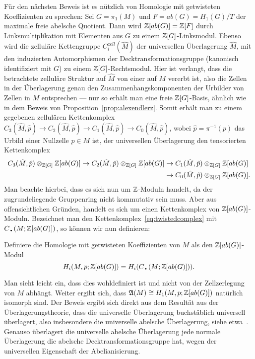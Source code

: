 	Für den nächsten Beweis ist es nützlich von Homologie mit getwisteten Koeffizienten zu sprechen: Sei $G=\pi_1(M)$ und $F=ab(G)=H_1(G)/T$ der maximale freie abelsche Quotient. Dann wird $\mathbb{Z}[ab(G)]=\mathbb{Z}[F]$ durch Linksmultiplikation mit Elementen aus $G$ zu einem $\mathbb{Z}[G]$-Linksmodul. Ebenso wird die zelluläre Kettengruppe $C^{zell}_i(\hat M)$ der universellen Überlagerung $\hat M$, mit den induzierten Automorphismen der Decktransformationsgruppe (kanonisch identifiziert mit $G$) zu einem $\mathbb{Z}[G]$-Rechtsmodul. Hier ist verlangt, dass die betrachtete zelluläre Struktur auf $\hat M$ von einer auf $M$ vererbt ist, also die Zellen in der Überlagerung genau den Zusammenhangskomponenten der Urbilder von Zellen in $M$ entsprechen --- nur so erhält man eine freie $\mathbb{Z}[G]$-Basis, ähnlich wie in dem Beweis von Proposition~\ref{prop:alexendlerz}. Somit erhält man zu einem gegebenen zellulären Kettenkomplex $C_3(\hat M,\hat p) \to C_2(\hat M,\hat p) \to C_1(\hat M,\hat p) \to C_0(\hat M,\hat p)$, wobei $\hat p = \pi^{-1}(p)$ das Urbild einer Nullzelle $p\in M$ ist, der universellen Überlagerung den tensorierten Kettenkomplex 
\begin{align}
			C_3(\hat M,\hat p)\otimes_{\mathbb{Z}[G]}\mathbb{Z}[ab(G)] \to C_2(\hat M,\hat p)\otimes_{\mathbb{Z}[G]}\mathbb{Z}[ab(G)]& \to C_1(\hat M,\hat p)\otimes_{\mathbb{Z}[G]}\mathbb{Z}[ab(G)] \label{eq:twistedcomplex}\\
			& \to C_0(\hat M,\hat p)\otimes_{\mathbb{Z}[G]}\mathbb{Z}[ab(G)]  \notag .
	\end{align}	
	Man beachte hierbei, dass es sich nun um $\mathbb{Z}$-Moduln handelt, da der zugrundeliegende Gruppenring nicht kommutativ sein muss. Aber aus offensichtlichen Gründen, handelt es sich um einen Kettenkomplex von $\mathbb{Z}[ab(G)]$-Moduln. Bezeichnet man den Kettenkomplex~\eqref{eq:twistedcomplex} mit $C_\text{\textbullet}(M;\ZZ[ab(G)])$, so können wir nun definieren:

	\begin{defn}
		Definiere die Homologie mit getwisteten Koeffizienten von $M$ als den $\mathbb{Z}[ab(G)]$-Modul 
		\[
		 H_i(M,p;\ZZ[ab(G)])=H_i(C_\text{\textbullet}(M;\ZZ[ab(G)])) 	.
		 \] 

	\end{defn}

	Man sieht leicht ein, dass dies wohldefiniert ist und nicht von der Zellzerlegung von $M$ abhängt. Weiter ergibt sich, dass $\mathfrak A(M) \cong H_1(M,p;\mathbb{Z}[ab(G)])$ natürlich isomorph sind. Der Beweis ergibt sich direkt aus dem Resultät aus der Überlagerungstheorie, dass die universelle Überlagerung buchstäblich universell überlagert, also insbesondere die universelle abelsche Überlagerung, siehe etwa~\cite[Kapitel~1.3]{Hatcher.2002}. Genauso überlagert die universelle abelsche Überlagerung jede normale Überlagerung die abelsche Decktransformationsgruppe hat, wegen der universellen Eigenschaft der Abelianisierung.
    
